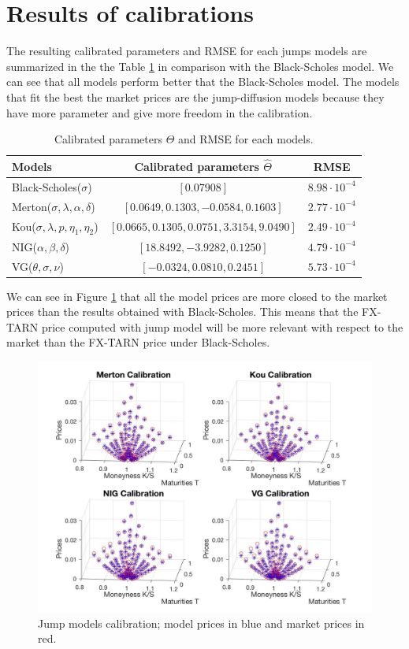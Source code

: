 \section{Results of calibrations}
\label{sec:calibration:results}
The resulting calibrated parameters and RMSE for each jumps models are summarized in the the Table \ref{tab:param} in comparison with the Black-Scholes model. We can see that all models perform better that the Black-Scholes model. The models that fit the best the market prices are the jump-diffusion models because they have more parameter and give more freedom in the calibration.
\begin{table}[!ht]
\centering
  \begin{tabular}{l|c|c}
    \toprule
    Models & Calibrated parameters $\hat{\Theta}$ & RMSE \\
    \toprule
   Black-Scholes($\sigma$) & $[0.07908]$ & $8.98\cdot 10^{-4}$ \\
   \midrule
   Merton($\sigma,\lambda,\alpha,\delta$)  & $[0.0649,0.1303,-0.0584,0.1603]$ & $2.77\cdot 10^{-4}$\\
   Kou($\sigma,\lambda,p,\eta_1,\eta_2$) & $[0.0665,0.1305,0.0751,3.3154,9.0490]$&$2.49 \cdot 10^{-4}$ \\
   \midrule
   NIG($\alpha,\beta,\delta$) & $[18.8492,-3.9282,0.1250]$&$4.79\cdot 10^{-4}$\\
   VG($\theta, \sigma,\nu$) & $[-0.0324,0.0810,0.2451]$&$5.73\cdot 10^{-4}$\\
    \bottomrule
  \end{tabular}
  \vspace{5pt}
  \caption{\label{tab:param} Calibrated parameters $\hat{\Theta}$ and RMSE for each models.}
\end{table}
\newpage
We can see in Figure \ref{fig:calibration:jump-prices} that all the model prices are more closed to the market prices than the results obtained with Black-Scholes. This means that the FX-TARN price computed with jump model will be more relevant with respect to the market than the FX-TARN price under Black-Scholes.

\begin{figure}[!htb]
\centering
	\includegraphics[width=\textwidth]{gfx/Jump-calibration}
	\caption{Jump models calibration; model prices in blue and market prices in red.}
	\label{fig:calibration:jump-prices}
\end{figure}